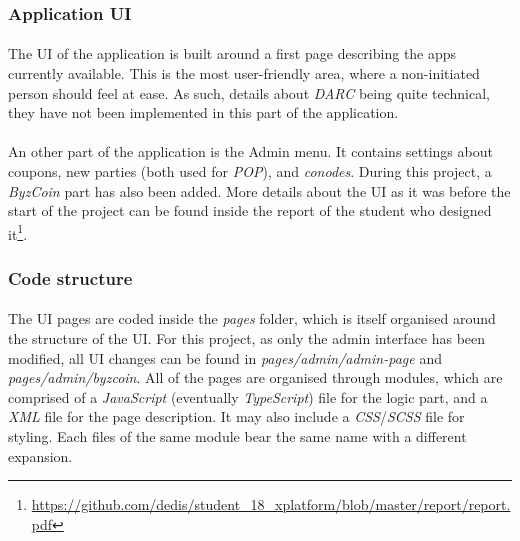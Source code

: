 \subsubsection{Application UI}

\paragraph{}

The UI of the application is built around a first page describing the apps currently available. This is the most user-friendly area, where a non-initiated person should feel at ease. As such, details about \textit{DARC} being quite technical, they have not been implemented in this part of the application.

\paragraph{}

An other part of the application is the Admin menu. It contains settings about coupons, new parties (both used for \textit{POP}), and \textit{conodes}. During this project, a \textit{ByzCoin} part has also been added. More details about the UI as it was before the start of the project can be found inside the report of the student who designed it\footnote{\url{https://github.com/dedis/student\_18\_xplatform/blob/master/report/report.pdf}}.

\subsubsection{Code structure}

\paragraph{}

The UI pages are coded inside the \textit{pages} folder, which is itself organised around the structure of the UI. For this project, as only the admin interface has been modified, all UI changes can be found in \textit{pages/admin/admin-page} and \textit{pages/admin/byzcoin}. All of the pages are organised through modules, which are comprised of a \textit{JavaScript} (eventually \textit{TypeScript}) file for the logic part, and a \textit{XML} file for the page description. It may also include a \textit{CSS}/\textit{SCSS} file for styling. Each files of the same module bear the same name with a different expansion.

